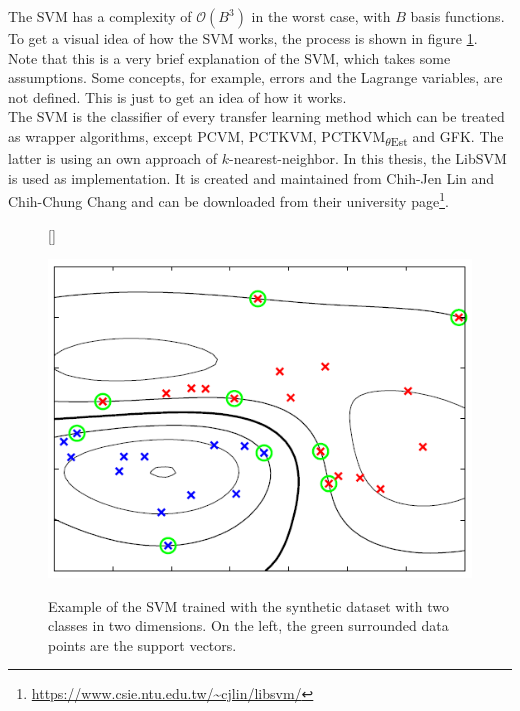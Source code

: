 The \ac{SVM} has a complexity of $\mathcal{O}(B^3)$ in the worst case, with $B$ basis functions.\cite[p. 329]{Bishop.2009}
To get a visual idea of how the \ac{SVM} works, the process is shown in figure \ref{FigSVMProd}.\\
Note that this is a very brief explanation of the \acs{SVM}, which takes some assumptions. 
Some concepts, for example, errors and the Lagrange variables, are not defined.
This is just to get an idea of how it works.\\
The \acs{SVM} is the classifier of every transfer learning method which can be treated as wrapper algorithms, except \acs{PCVM}, \acs{PCTKVM}, \acs{PCTKVM}\textsubscript{$\theta$Est} and \acs{GFK}.
The latter is using an own approach of $k$-nearest-neighbor.
In this thesis, the LibSVM is used as implementation.
It is created and maintained from Chih-Jen Lin and Chih-Chung Chang and can be downloaded from their university page\footnote{\url{https://www.csie.ntu.edu.tw/~cjlin/libsvm/}}.
\begin{figure}
	\centering
	[\FBwidth]
	{\caption[Example of SVM Classification]{Example of the SVM trained with the synthetic dataset with two classes in two dimensions. On the left, the green surrounded data points are the support vectors.\cite[p. 331]{Bishop.2009}}}
	{\includegraphics[width=\linewidth]{figures/SVMProd.png}\label{FigSVMProd}}
\end{figure}

